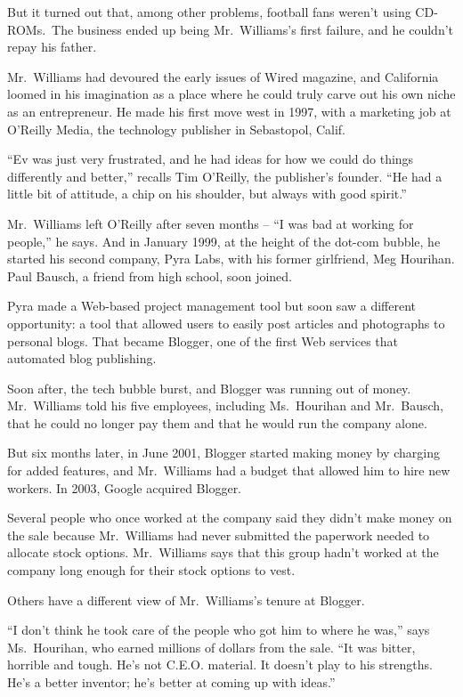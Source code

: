 ﻿\documentclass[12pt]{article}
\begin{document}
But it turned out that, among other problems, football fans weren't using CD-ROMs.~The business
ended up being Mr.~Williams's first failure, and he couldn't repay his father.

Mr.~Williams had devoured the early issues of Wired magazine, and California loomed in his
imagination as a place where he could truly carve out his own niche as an entrepreneur. He made his
first move west in 1997, with a marketing job at O'Reilly Media, the technology publisher in
Sebastopol, Calif.

``Ev was just very frustrated, and he had ideas for how we could do things differently and better,''
recalls Tim O'Reilly, the publisher's founder. ``He had a little bit of attitude, a chip on his
shoulder, but always with good spirit.''

Mr.~Williams left O'Reilly after seven months -- ``I was bad at working for people,'' he says. And
in January 1999, at the height of the dot-com bubble, he started his second company, Pyra Labs, with
his former girlfriend, Meg Hourihan. Paul Bausch, a friend from high school, soon joined.

Pyra made a Web-based project management tool but soon saw a different opportunity: a tool that
allowed users to easily post articles and photographs to personal blogs. That became Blogger, one of
the first Web services that automated blog publishing.

Soon after, the tech bubble burst, and Blogger was running out of money. Mr.~Williams told his five
employees, including Ms.~Hourihan and Mr.~Bausch, that he could no longer pay them and that he would
run the company alone.

But six months later, in June 2001, Blogger started making money by charging for added features, and
Mr.~Williams had a budget that allowed him to hire new workers. In 2003, Google acquired Blogger.

Several people who once worked at the company said they didn't make money on the sale because
Mr.~Williams had never submitted the paperwork needed to allocate stock options. Mr.~Williams says
that this group hadn't worked at the company long enough for their stock options to vest.

Others have a different view of Mr.~Williams's tenure at Blogger.

``I don't think he took care of the people who got him to where he was,'' says Ms.~Hourihan, who
earned millions of dollars from the sale. ``It was bitter, horrible and tough. He's not C.E.O.
material. It doesn't play to his strengths. He's a better inventor; he's better at coming up with
ideas.''
\end{document}

